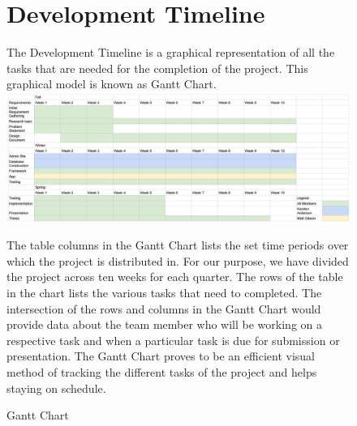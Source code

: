 \begin{figure}
\chapter{Development Timeline}
The Development Timeline is a graphical representation of all the tasks that are needed for the completion of the project. This graphical model is known as Gantt Chart.
\newline
\includegraphics[width=1\textwidth]{images/gantt.png}
\caption{Gantt Chart}
The table columns in the Gantt Chart lists the set time periods over which the project is distributed in. For our purpose, we have divided the project across ten weeks for each quarter. The rows of the table in the chart lists the various tasks that need to completed. The intersection of the rows and columns in the Gantt Chart would provide data about the team member who will be working on a respective task and when a particular task is due for submission or presentation.
 The Gantt Chart proves to be an efficient visual method of tracking the different tasks of the project and helps staying on schedule.
\end{figure}
